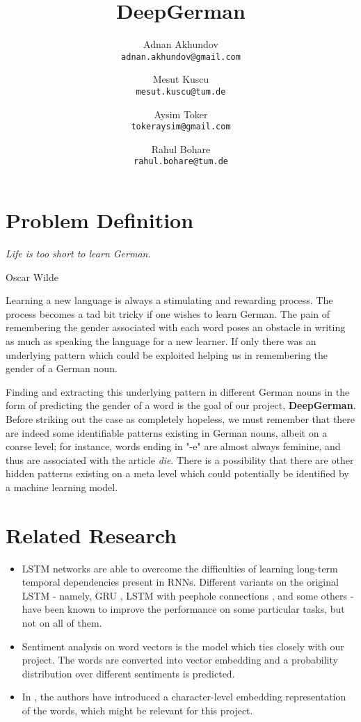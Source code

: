 \documentclass[10pt,twocolumn,letterpaper]{article}
\begin{document}
\title{DeepGerman}

\author{Adnan Akhundov\\
{\tt\small adnan.akhundov@gmail.com}
\and
Mesut Kuscu\\
{\tt\small mesut.kuscu@tum.de}
\and
Aysim Toker\\
{\tt\small tokeraysim@gmail.com}
\and
Rahul Bohare\\
{\tt\small rahul.bohare@tum.de}
}

\maketitle

\section{Problem Definition}
\epigraph{\textit{Life is too short to learn German}.}{Oscar Wilde}
Learning a new language is always a stimulating and rewarding process. The process becomes a tad bit tricky if one wishes to learn German. The pain of remembering the gender associated with each word poses an obstacle in writing as much as speaking the language for a new learner.
If only there was an underlying pattern which could be exploited helping us in remembering the gender of a German noun.\par
Finding and extracting this underlying pattern in different German nouns in the form of predicting the gender of a word is the goal of our project, \textbf{DeepGerman}. Before striking out the case as completely hopeless, we must remember that there are indeed some identifiable patterns existing in German nouns, albeit on a coarse level; for instance, words ending in {"}-e{"} are almost always feminine, and thus are associated with the article \textit{die}.
There is a possibility that there are other hidden patterns existing on a meta level which could potentially be identified by a machine learning model.

\section{Related Research}
\begin{itemize}
    \item LSTM networks \cite{lstm} are able to overcome the difficulties of learning long-term temporal dependencies present in RNNs. Different variants on the original LSTM - namely, GRU \cite{gru}, LSTM with peephole connections \cite{peephole}, and some others - have been known to improve the performance on some particular tasks, but not on all of them.
    \item Sentiment analysis on word vectors \cite{ng} is the model which ties closely with our project. The words are converted into vector embedding and a probability distribution over different sentiments is predicted.
    \item In \cite{santos}, the authors have introduced a character-level embedding representation of the words, which might be relevant for this project.
\end{itemize}
\end{document}
